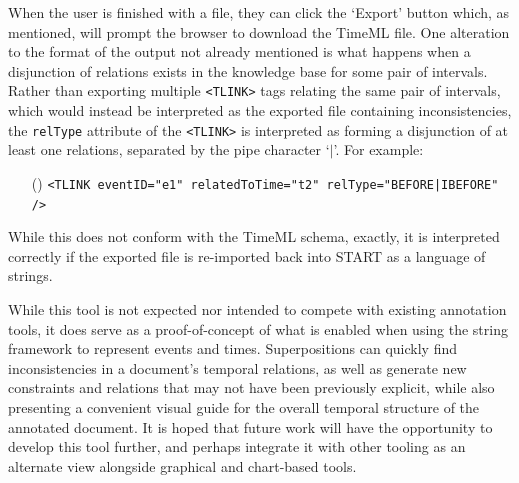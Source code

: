 \documentclass[a4paper,12pt,leqno,twoside]{article}
\newcommand{\ipp}{(\refstepcounter{equation}\theequation)}
\begin{document}
When the user is finished with a file, they can click the `Export' button which, as mentioned, will prompt the browser to download the TimeML file. One alteration to the format of the output not already mentioned is what happens when a disjunction of relations exists in the knowledge base for some pair of intervals. Rather than exporting multiple \verb|<TLINK>| tags relating the same pair of intervals, which would instead be interpreted as the exported file containing inconsistencies, the \verb|relType| attribute of the \verb|<TLINK>| is interpreted as forming a disjunction of at least one relations, separated by the pipe character `$|$'. For example:
\begin{itemize}
	\item[\ipp] \verb!<TLINK eventID="e1" relatedToTime="t2" relType="BEFORE|IBEFORE" />!
\end{itemize}
While this does not conform with the TimeML schema, exactly, it is interpreted correctly if the exported file is re-imported back into START as a language of strings.

While this tool is not expected nor intended to compete with existing annotation tools, it does serve as a proof-of-concept of what is enabled when using the string framework to represent events and times. Superpositions can quickly find inconsistencies in a document's temporal relations, as well as generate new constraints and relations that may not have been previously explicit, while also presenting a convenient visual guide for the overall temporal structure of the annotated document. It is hoped that future work will have the opportunity to develop this tool further, and perhaps integrate it with other tooling as an alternate view alongside graphical and chart-based tools.

\end{document}
